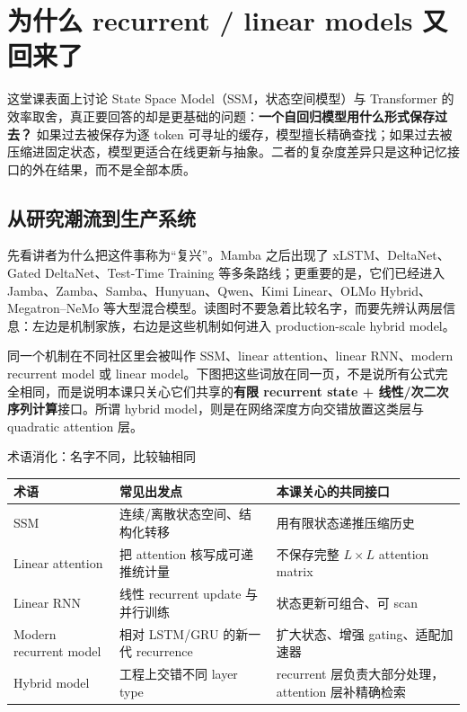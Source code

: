 \section{为什么 recurrent / linear models 又回来了}

这堂课表面上讨论 State Space Model（SSM，状态空间模型）与 Transformer 的效率取舍，真正要回答的却是更基础的问题：\textbf{一个自回归模型用什么形式保存过去？} 如果过去被保存为逐 token 可寻址的缓存，模型擅长精确查找；如果过去被压缩进固定状态，模型更适合在线更新与抽象。二者的复杂度差异只是这种记忆接口的外在结果，而不是全部本质。

\subsection{从研究潮流到生产系统}

先看讲者为什么把这件事称为“复兴”。Mamba 之后出现了 xLSTM、DeltaNet、Gated DeltaNet、Test-Time Training 等多条路线；更重要的是，它们已经进入 Jamba、Zamba、Samba、Hunyuan、Qwen、Kimi Linear、OLMo Hybrid、Megatron--NeMo 等大型混合模型。读图时不要急着比较名字，而要先辨认两层信息：左边是机制家族，右边是这些机制如何进入 production-scale hybrid model。



同一个机制在不同社区里会被叫作 SSM、linear attention、linear RNN、modern recurrent model 或 linear model。下图把这些词放在同一页，不是说所有公式完全相同，而是说明本课只关心它们共享的\textbf{有限 recurrent state + 线性/次二次序列计算}接口。所谓 hybrid model，则是在网络深度方向交错放置这类层与 quadratic attention 层。


\begin{knowledgebox}{术语消化：名字不同，比较轴相同}
\begin{tabularx}{\textwidth}{L{0.20\textwidth}X X}
\toprule
术语 & 常见出发点 & 本课关心的共同接口 \\
\midrule
SSM & 连续/离散状态空间、结构化转移 & 用有限状态递推压缩历史 \\
Linear attention & 把 attention 核写成可递推统计量 & 不保存完整 $L\times L$ attention matrix \\
Linear RNN & 线性 recurrent update 与并行训练 & 状态更新可组合、可 scan \\
Modern recurrent model & 相对 LSTM/GRU 的新一代 recurrence & 扩大状态、增强 gating、适配加速器 \\
Hybrid model & 工程上交错不同 layer type & recurrent 层负责大部分处理，attention 层补精确检索 \\
\bottomrule
\end{tabularx}
\end{knowledgebox}

